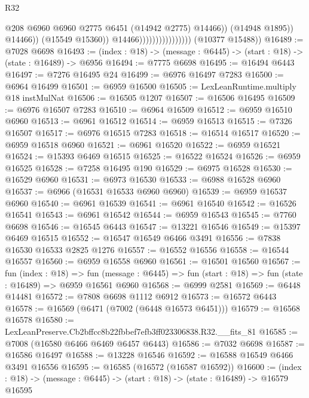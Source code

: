 \begin{lexlean}{R32}
\begin{coremodule}
                                                  @208
                                                  @6960
                                                  @6960
                                                  @2775
                                                  @6451
                                                  (@14942 @2775)
                                                  @14466))
                                              (@14948 @1895))
                                            @14466))
                                        (@15549 @15360))
                                      @14466))))))))))))))))
      (@10377 @15488))
@16489 := @7028 @6698
@16493 := (index : @18) -> (message : @6445) -> (start : @18) -> (state : @16489) -> @6956
@16494 := @7775 @6698
@16495 := @16494 @6443
@16497 := @7276 @16495 @24
@16499 := @6976 @16497 @7283
@16500 := @6964 @16499
@16501 := @6959 @16500
@16505 := LexLeanRuntime.multiply @18 instMulNat
@16506 := @16505 @1207
@16507 := @16506 @16495
@16509 := @6976 @16507 @7283
@16510 := @6964 @16509
@16512 := @6959 @16510 @6960
@16513 := @6961 @16512
@16514 := @6959 @16513
@16515 := @7326 @16507
@16517 := @6976 @16515 @7283
@16518 := @16514 @16517
@16520 := @6959 @16518 @6960
@16521 := @6961 @16520
@16522 := @6959 @16521
@16524 := @15393 @6469 @16515
@16525 := @16522 @16524
@16526 := @6959 @16525
@16528 := @7258 @16495 @190
@16529 := @6975 @16528
@16530 := @16529 @6960
@16531 := @6973 @16530
@16533 := @6988 @16528 @6960
@16537 := @6966 (@16531 @16533 @6960 @6960)
@16539 := @6959 @16537 @6960
@16540 := @6961 @16539
@16541 := @6961 @16540
@16542 := @16526 @16541
@16543 := @6961 @16542
@16544 := @6959 @16543
@16545 := @7760 @6698
@16546 := @16545 @6443
@16547 := @13221 @16546
@16549 := @15397 @6469 @16515
@16552 := @16547 @16549 @6466 @3491
@16556 := @7838 @16530 @16533 @2825 @1276
@16557 := @16552 @16556
@16558 := @16544 @16557
@16560 := @6959 @16558 @6960
@16561 := @16501 @16560
@16567 := fun (index : @18) =>
  fun (message : @6445) => fun (start : @18) => fun (state : @16489) => @6959 @16561 @6960
@16568 := @6999 @2581
@16569 := @6448 @14481
@16572 := @7808 @6698 @1112 @6912
@16573 := @16572 @6443
@16578 := @16569 (@6471 (@7002 (@6448 @16573 @6451)))
@16579 := @16568 @16578
@16580 := LexLeanPreserve.Cb2bffcc8b22fbbef7efb3ff023306838.R32.__fits_81
@16585 := @7008 (@16580 @6466 @6469 @6457 @6443)
@16586 := @7032 @6698
@16587 := @16586 @16497
@16588 := @13228 @16546
@16592 := @16588 @16549 @6466 @3491 @16556
@16595 := @16585 (@16572 (@16587 @16592))
@16600 := (index : @18) -> (message : @6445) -> (start : @18) -> (state : @16489) -> @16579 @16595

\end{coremodule}
\end{lexlean}
